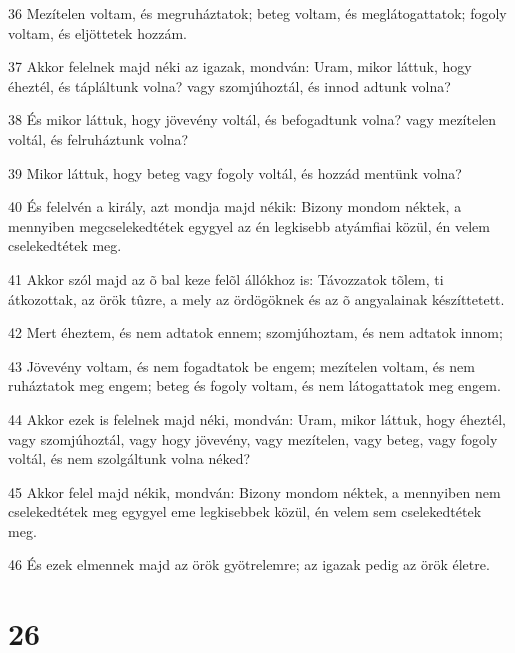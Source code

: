 \par 36 Mezítelen voltam, és megruháztatok; beteg voltam, és meglátogattatok; fogoly voltam, és eljöttetek hozzám.
\par 37 Akkor felelnek majd néki az igazak, mondván: Uram, mikor láttuk, hogy éheztél, és tápláltunk volna? vagy szomjúhoztál, és innod adtunk volna?
\par 38 És mikor láttuk, hogy jövevény voltál, és befogadtunk volna? vagy mezítelen voltál, és felruháztunk volna?
\par 39 Mikor láttuk, hogy beteg vagy fogoly voltál, és hozzád mentünk volna?
\par 40 És felelvén a király, azt mondja majd nékik: Bizony mondom néktek, a mennyiben megcselekedtétek egygyel az én legkisebb atyámfiai közül, én velem cselekedtétek meg.
\par 41 Akkor szól majd az õ bal keze felõl állókhoz is: Távozzatok tõlem, ti átkozottak, az örök tûzre, a mely az ördögöknek és az õ angyalainak készíttetett.
\par 42 Mert éheztem, és nem adtatok ennem; szomjúhoztam, és nem adtatok innom;
\par 43 Jövevény voltam, és nem fogadtatok be engem; mezítelen voltam, és nem ruháztatok meg engem; beteg és fogoly voltam, és nem látogattatok meg engem.
\par 44 Akkor ezek is felelnek majd néki, mondván: Uram, mikor láttuk, hogy éheztél, vagy szomjúhoztál, vagy hogy jövevény, vagy mezítelen, vagy beteg, vagy fogoly voltál, és nem szolgáltunk volna néked?
\par 45 Akkor felel majd nékik, mondván: Bizony mondom néktek, a mennyiben nem cselekedtétek meg egygyel eme legkisebbek közül, én velem sem cselekedtétek meg.
\par 46 És ezek elmennek majd az örök gyötrelemre; az igazak pedig az örök életre.

\chapter{26}

